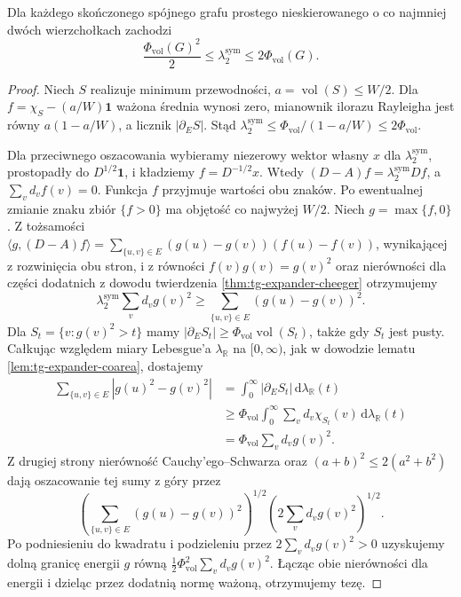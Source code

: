 \begin{twierdzenie}
\label{thm:tg-expander-weighted-cheeger}
Dla każdego skończonego spójnego grafu prostego
nieskierowanego o co najmniej dwóch wierzchołkach
zachodzi
\[
\frac{\Phi_{\mathrm{vol}}(G)^2}{2}
\leq\lambda_2^{\mathrm{sym}}\leq2\Phi_{\mathrm{vol}}(G).
\]
\end{twierdzenie}
\begin{proof}
Niech $S$ realizuje minimum przewodności,
$a=\operatorname{vol}(S)\leq W/2$.
Dla $f=\chi_S-(a/W)\boldsymbol1$ ważona średnia
wynosi zero, mianownik ilorazu Rayleigha jest
równy $a(1-a/W)$, a licznik $|\partial_ES|$.
Stąd $\lambda_2^{\mathrm{sym}}\leq
\Phi_{\mathrm{vol}}/(1-a/W)\leq2\Phi_{\mathrm{vol}}$.

Dla przeciwnego oszacowania wybieramy niezerowy
wektor własny $x$ dla $\lambda_2^{\mathrm{sym}}$,
prostopadły do $D^{1/2}\boldsymbol1$,
i kładziemy $f=D^{-1/2}x$. Wtedy
$(D-A)f=\lambda_2^{\mathrm{sym}}Df$,
a $\sum_vd_vf(v)=0$. Funkcja $f$ przyjmuje
wartości obu znaków. Po ewentualnej zmianie znaku
zbiór $\{f>0\}$ ma objętość co najwyżej $W/2$.
Niech $g=\max\{f,0\}$.
Z tożsamości
$\langle g,(D-A)f\rangle=
\sum_{\{u,v\}\in E}(g(u)-g(v))(f(u)-f(v))$,
wynikającej z rozwinięcia obu stron, i z równości
$f(v)g(v)=g(v)^2$ oraz nierówności dla części dodatnich
z dowodu twierdzenia \ref{thm:tg-expander-cheeger}
otrzymujemy
\[
\lambda_2^{\mathrm{sym}}\sum_vd_vg(v)^2
\geq\sum_{\{u,v\}\in E}(g(u)-g(v))^2.
\]
Dla $S_t=\{v:g(v)^2>t\}$ mamy
$|\partial_ES_t|\geq\Phi_{\mathrm{vol}}\operatorname{vol}(S_t)$,
także gdy $S_t$ jest pusty. Całkując względem miary Lebesgue'a $\lambda_{\mathbb R}$
na $[0,\infty)$, jak w dowodzie lematu
\ref{lem:tg-expander-coarea}, dostajemy
\[
\begin{aligned}
\sum_{\{u,v\}\in E}|g(u)^2-g(v)^2|
&=\int_0^\infty|\partial_ES_t|\,\mathrm d\lambda_{\mathbb R}(t)\\
&\geq\Phi_{\mathrm{vol}}\int_0^\infty
\sum_v d_v\chi_{S_t}(v)\,\mathrm d\lambda_{\mathbb R}(t)\\
&=\Phi_{\mathrm{vol}}\sum_vd_vg(v)^2.
\end{aligned}
\]
Z drugiej strony nierówność Cauchy'ego--Schwarza
oraz $(a+b)^2\leq2(a^2+b^2)$ dają oszacowanie
tej sumy z góry przez
\[
\left(\sum_{\{u,v\}\in E}(g(u)-g(v))^2\right)^{1/2}
\left(2\sum_v d_vg(v)^2\right)^{1/2}.
\]
Po podniesieniu do kwadratu i podzieleniu przez
$2\sum_vd_vg(v)^2>0$ uzyskujemy dolną granicę
energii $g$ równą
$\tfrac12\Phi_{\mathrm{vol}}^2\sum_vd_vg(v)^2$.
Łącząc obie nierówności dla energii i dzieląc
przez dodatnią normę ważoną, otrzymujemy tezę.
\end{proof}

